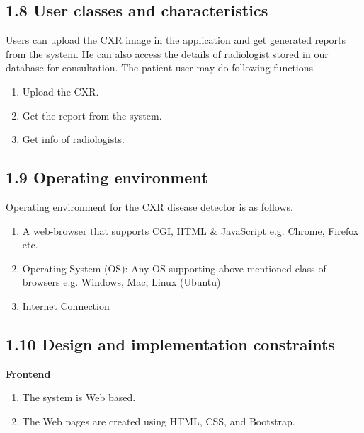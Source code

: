\documentclass{article} %
\begin{document}
\noindent 
\subsection{1.8 User classes and characteristics}

\noindent Users can upload the CXR image in the application and get generated reports from the system. He can also access the details of radiologist stored in our database for consultation. The patient user may do following functions\textit{}

\begin{enumerate}
\item \textit{ }Upload the CXR.\textit{}

\item \textit{ }Get the report from the system.\textit{}

\item \textit{ }Get info of radiologists.\textit{}
\end{enumerate}

\noindent 
\subsection{1.9 Operating environment}

\noindent Operating environment for the CXR disease detector is as follows.

\begin{enumerate}
\item  A web-browser that supports CGI, HTML \& JavaScript e.g. Chrome, Firefox etc.~

\item  Operating System (OS): Any OS supporting above mentioned class of browsers e.g. Windows, Mac, Linux (Ubuntu)

\item  Internet Connection~
\end{enumerate}

\noindent 
\subsection{1.10 Design and implementation constraints}

\noindent \textbf{Frontend}\textit{}

\begin{enumerate}
\item \textit{ }The system is Web based. 

\item  The Web pages are created using HTML, CSS, and Bootstrap.
\end{enumerate}
\end{document}
